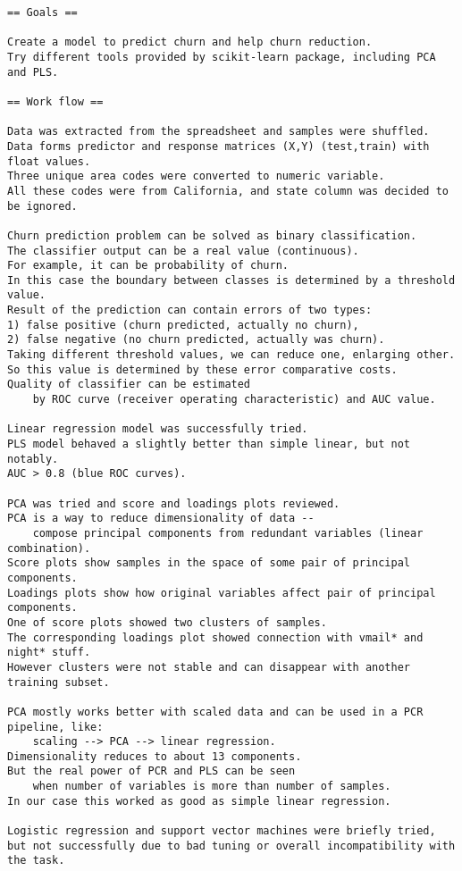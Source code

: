 \documentclass{article}
\begin{document}
\begin{verbatim}
== Goals ==

Create a model to predict churn and help churn reduction.
Try different tools provided by scikit-learn package, including PCA and PLS.

== Work flow ==

Data was extracted from the spreadsheet and samples were shuffled.
Data forms predictor and response matrices (X,Y) (test,train) with float values.
Three unique area codes were converted to numeric variable.
All these codes were from California, and state column was decided to be ignored.

Churn prediction problem can be solved as binary classification.
The classifier output can be a real value (continuous).
For example, it can be probability of churn.
In this case the boundary between classes is determined by a threshold value.
Result of the prediction can contain errors of two types:
1) false positive (churn predicted, actually no churn),
2) false negative (no churn predicted, actually was churn).
Taking different threshold values, we can reduce one, enlarging other.
So this value is determined by these error comparative costs.
Quality of classifier can be estimated 
    by ROC curve (receiver operating characteristic) and AUC value.

Linear regression model was successfully tried.
PLS model behaved a slightly better than simple linear, but not notably.
AUC > 0.8 (blue ROC curves).

PCA was tried and score and loadings plots reviewed.
PCA is a way to reduce dimensionality of data -- 
    compose principal components from redundant variables (linear combination).
Score plots show samples in the space of some pair of principal components.
Loadings plots show how original variables affect pair of principal components.
One of score plots showed two clusters of samples.
The corresponding loadings plot showed connection with vmail* and night* stuff.
However clusters were not stable and can disappear with another training subset.

PCA mostly works better with scaled data and can be used in a PCR pipeline, like:
    scaling --> PCA --> linear regression.
Dimensionality reduces to about 13 components.
But the real power of PCR and PLS can be seen 
    when number of variables is more than number of samples.
In our case this worked as good as simple linear regression.

Logistic regression and support vector machines were briefly tried, 
but not successfully due to bad tuning or overall incompatibility with the task.


\end{verbatim}
\end{document}
